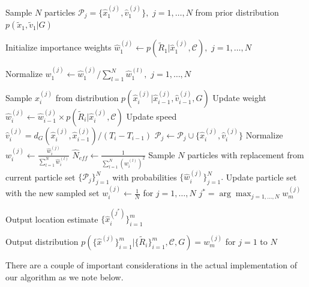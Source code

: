 \documentclass[conference, 10pt]{IEEEtran}
\begin{document}
\begin{algorithm}
\caption{$LocalizeUEpf(\mathcal{D}_{tr},\mathcal{C},G,N_{th})$}
\label{alg:LocalizeUEpf}
\begin{algorithmic}[1]

\State Sample $N$ particles $\mathcal{P}_j = \{\hat{x}_1^{(j)},\hat{v}_1^{(j)}\},$ $j=1,\hdots , N$ 
from prior distribution $p(\tilde{x}_1, \tilde{v}_1|G)$ 

\State Initialize importance weights $\hat{w}_1^{(j)} \gets p(\tilde{R}_1|\hat{x}_1^{(j)}, \mathcal{C}),$ $j=1,\hdots , N$

\State Normalize $w_1^{(j)} \gets \hat{w}_1^{(j)}/\sum_{l=1}^N \hat{w}_1^{(l)},$ $j=1,\hdots , N$

		\State Sample $\hat{x}_i^{(j)}$ from distribution $p(\hat{x}_i^{(j)}|\hat{x}_{i-1}^{(j)},\hat{v}_{i-1}^{(j)},G)$
		\State Update weight $\hat{w}_i^{(j)} \gets \hat{w}_{i-1}^{(j)} \times p(\tilde{R}_i|\hat{x}_{i}^{(j)},\mathcal{C})$ 
		\State Update speed $\hat{v}_i^{(j)} = d_G(\hat{x}_i^{(j)},\hat{x}_{i-1}^{(j)})/(T_i - T_{i-1})$
		\State $\mathcal{P}_j \gets \mathcal{P}_j \cup \{\hat{x}_i^{(j)},\hat{v}_i^{(j)}\}$
	\EndFor
	\State Normalize $w_i^{(j)} \gets \frac{\hat{w}_i^{(j)}}{\sum_{l=1}^N \hat{w}_i^{(l)}}$
	\State $\hat{N}_{eff} \gets \frac{1}{\sum_{l=1}^N (w_{i}^{(l)})^2}$
		\State Sample $N$ particles with replacement from current particle set $\{\mathcal{P}_j\}_{j=1}^N$ with probabilities $\{\hat{w}_i^{(j)}\}_{j=1}^N.$ Update particle set with the new sampled set
		\State $w_i^{(j)} \gets \frac{1}{N}$ for $j=1,\hdots , N$
	\EndIf
\EndFor
\State $j^* = \arg \max_{j = 1 , \hdots, N} w_m^{(j)}$

\State Output location estimate $\{\hat{x}_i^{(j^*)}\}_{i=1}^m$ 

\State Output distribution $p(\{\hat{x}^{(j)}\}_{i=1}^m|\{\tilde{R}_i\}_{i=1}^m,\mathcal{C},G) = w_m^{(j)}$ for $j=1$ to $N$
\end{algorithmic}
\end{algorithm}  

There are a couple of important considerations in the actual implementation of
our algorithm as we note below.
\end{document}
